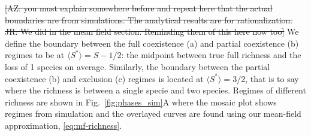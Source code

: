 \documentclass[9pt,twocolumn,twoside,lineno]{pnas-new}
\begin{document}
\iffalse
\begin{center}
\begin{tabular}{lccc}
\hline
\multirow{2}{4em}{\textcolor{black}{modality:}} & &
      \textcolor{black}{$R_n(\tilde{x} \rightarrow \tilde{x} +1)=R_n(\tilde{x}+1 \rightarrow \tilde{x})$} \\ &
     & \textcolor{black}{$R_n(0 \rightarrow 1)=R_n(1 \rightarrow 0)$}   \\
    \hline 
    \multirow{2}{4em}{\textcolor{black}{richness:}}  & & \textcolor{black}{$R_{S^*}(1 \rightarrow 2)=R_{S^*}(2 \rightarrow 1)$} \\ &
     & \textcolor{black}{$R_{S^*}(S \rightarrow S-1)=R_{S^*}(S-1 \rightarrow S)$}
\\
\hline
\end{tabular}    
\end{center}

\fi

\st{ [AZ: you must explain somewhere before and repeat here that the actual boundaries are from simulations. The analytical results are for rationalization. JR: We did in the mean field section. Reminding them of this here now too]}
We define the boundary between the full coexistence (a) and partial coexistence (b) regimes to be at $\langle S^* \rangle=S-1/2$: the midpoint between true full richness and the loss of 1 species on average.
Similarly, the boundary between the partial coexistence (b) and exclusion (c) regimes is located at $\langle S^* \rangle=3/2$, that is to say where the richness is between a single specie and two species.
Regimes of different richness are shown in Fig.~\ref{fig:phases_sim}A where the mosaic plot shows regimes from simulation and the overlayed curves are found using our mean-field approximation, \eqref{eq:mf-richness}.
\end{document}
